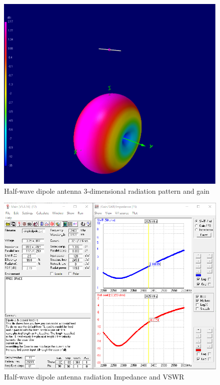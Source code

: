 \begin{figure}[h!]
\centering
\includegraphics[scale=0.5]{figures/SimulatedDipoleRad.PNG}
\caption{Half-wave dipole antenna 3-dimensional radiation pattern and gain}
\end{figure}

\begin{figure}[h!]
\centering
\includegraphics[scale=0.5]{figures/DipoleImpedanceVSWR.PNG}
\caption{Half-wave dipole antenna radiation Impedance and VSWR}
\end{figure}

